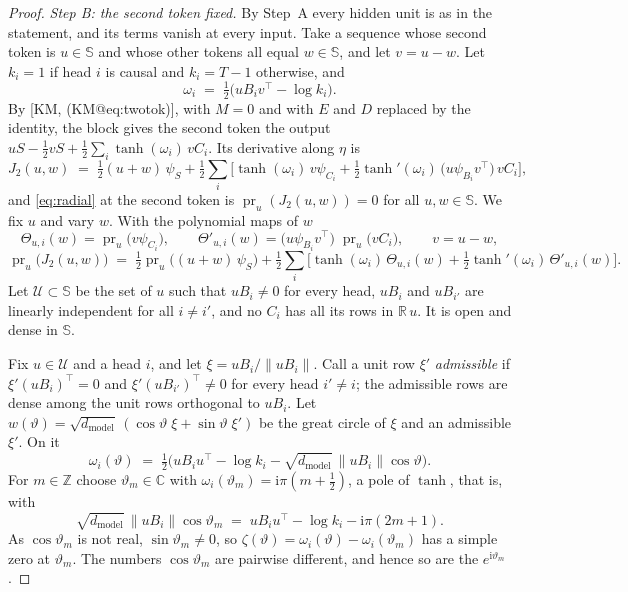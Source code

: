 \documentclass[10pt]{article}
\makeatletter
\theoremstyle{definition}
\theoremstyle{remark}
\newcommand{\R}{\mathbb{R}}
\newcommand{\dm}{d_{\mathrm{model}}}
\newcommand{\norm}[1]{\lVert #1\rVert}
\newcommand{\KMn}[1]{\csname KM@#1\endcsname}
\newcommand{\KMeq}[1]{[KM, (\KMn{#1})]}
\makeatother
\begin{document}
\begin{proof}
\emph{Step B: the second token fixed.} By Step~A every hidden unit is as in the statement, and its terms vanish at every input. Take a sequence whose second token is $u \in \mathbb S$ and whose other tokens all equal $w \in \mathbb S$, and let $v = u - w$. Let $k_i = 1$ if head $i$ is causal and $k_i = T - 1$ otherwise, and
\[
\omega_i \;=\; \tfrac12\big(uB_iv^\top - \log k_i\big).
\]
By \KMeq{eq:twotok}, with $M = 0$ and with $E$ and $D$ replaced by the identity, the block gives the second token the output $uS - \tfrac12vS + \tfrac12\sum_i\tanh(\omega_i)\,vC_i$. Its derivative along $\eta$ is
\[
J_2(u, w) \;=\; \tfrac12(u + w)\,\psi_S + \tfrac12\sum_i\Big[\tanh(\omega_i)\,v\psi_{C_i} + \tfrac12\tanh'(\omega_i)\,\big(u\psi_{B_i}v^\top\big)\,vC_i\Big],
\]
and \eqref{eq:radial} at the second token is $\operatorname{pr}_u(J_2(u, w)) = 0$ for all $u, w \in \mathbb S$. We fix $u$ and vary $w$. With the polynomial maps of $w$
\[
\Theta_{u,i}(w) = \operatorname{pr}_u\big(v\psi_{C_i}\big), \qquad \Theta'_{u,i}(w) = \big(u\psi_{B_i}v^\top\big)\;\operatorname{pr}_u\big(vC_i\big), \qquad v = u - w,
\]
\begin{equation}\label{eq:sphereB}
\operatorname{pr}_u\big(J_2(u, w)\big) \;=\; \tfrac12\operatorname{pr}_u\big((u + w)\,\psi_S\big) + \tfrac12\sum_i\Big[\tanh(\omega_i)\,\Theta_{u,i}(w) + \tfrac12\tanh'(\omega_i)\,\Theta'_{u,i}(w)\Big].
\end{equation}
Let $\mathcal U \subset \mathbb S$ be the set of $u$ such that $uB_i \neq 0$ for every head, $uB_i$ and $uB_{i'}$ are linearly independent for all $i \neq i'$, and no $C_i$ has all its rows in $\R\,u$. It is open and dense in $\mathbb S$.

Fix $u \in \mathcal U$ and a head $i$, and let $\xi = uB_i/\norm{uB_i}$. Call a unit row $\xi'$ \emph{admissible} if $\xi'(uB_i)^\top = 0$ and $\xi'(uB_{i'})^\top \neq 0$ for every head $i' \neq i$; the admissible rows are dense among the unit rows orthogonal to $uB_i$. Let $w(\vartheta) = \sqrt{\dm}\,(\cos\vartheta\;\xi + \sin\vartheta\;\xi')$ be the great circle of $\xi$ and an admissible $\xi'$. On it
\[
\omega_i(\vartheta) \;=\; \tfrac12\big(uB_iu^\top - \log k_i - \sqrt{\dm}\,\norm{uB_i}\cos\vartheta\big).
\]
For $m \in \mathbb Z$ choose $\vartheta_m \in \mathbb C$ with $\omega_i(\vartheta_m) = \mathrm i\pi(m + \tfrac12)$, a pole of $\tanh$, that is, with
\[
\sqrt{\dm}\,\norm{uB_i}\cos\vartheta_m \;=\; uB_iu^\top - \log k_i - \mathrm i\pi(2m+1).
\]
As $\cos\vartheta_m$ is not real, $\sin\vartheta_m \neq 0$, so $\zeta(\vartheta) = \omega_i(\vartheta) - \omega_i(\vartheta_m)$ has a simple zero at $\vartheta_m$. The numbers $\cos\vartheta_m$ are pairwise different, and hence so are the $e^{\mathrm i\vartheta_m}$.


\end{proof}
\end{document}
